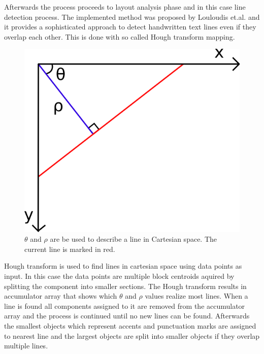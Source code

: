 \documentclass{article}
\begin{document}
\begin{multicols}{2}
        Afterwards the process proceeds to layout analysis phase and in this case line detection process. The implemented method was proposed by Louloudis et.al. and it provides a sophisticated approach to detect handwritten text lines even if they overlap each other. This is done with so called Hough transform mapping.

        \begin{figure}[H]
          \centering
          \includegraphics[natwidth=555,natheight=555,scale=0.6]{hough_space.png}
          \caption{$\theta$ and $\rho$ are be used to describe a line in Cartesian space. The current line is marked in red. \label{fig:houghspace2}}
        \end{figure}

        Hough transform is used to find lines in cartesian space using data points as input. In this case the data points are multiple block centroids aquired by splitting the component into smaller sections. The Hough transform results in accumulator array that shows which $\theta$ and $\rho$ values realize most lines. When a line is found all components assigned to it are removed from the accumulator array and the process is continued until no new lines can be found. Afterwards the smallest objects which represent accents and punctuation marks are assigned to nearest line and the largest objects are split into smaller objects if they overlap multiple lines.


\end{multicols}
\end{document}
